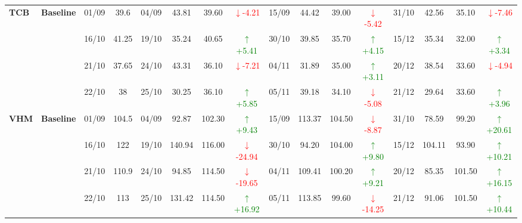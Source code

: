 \documentclass{ieeeaccess}
\begin{document}
{\begin{longtable}{llcc|cccc|cccc|cccc}
\multirow{4}{*}{\textbf{TCB}}
& \textbf{Baseline}
& 01/09 & 39.6 & 04/09 & 43.81 & 39.60 & \textcolor{red}{\(\downarrow\)-4.21} & 15/09 & 44.42 & 39.00 & \textcolor{red}{\(\downarrow\)-5.42} & 31/10 & 42.56 & 35.10 & \textcolor{red}{\(\downarrow\)-7.46} \\
& & 16/10 & 41.25 & 19/10 & 35.24 & 40.65 & \textcolor{green}{\(\uparrow\)+5.41} & 30/10 & 39.85 & 35.70 & \textcolor{green}{\(\uparrow\)+4.15} & 15/12 & 35.34 & 32.00 & \textcolor{green}{\(\uparrow\)+3.34} \\
& & 21/10 & 37.65 & 24/10 & 43.31 & 36.10 & \textcolor{red}{\(\downarrow\)-7.21} & 04/11 & 31.89 & 35.00 & \textcolor{green}{\(\uparrow\)+3.11} & 20/12 & 38.54 & 33.60 & \textcolor{red}{\(\downarrow\)-4.94} \\
& & 22/10 & 38 & 25/10 & 30.25 & 36.10 & \textcolor{green}{\(\uparrow\)+5.85} & 05/11 & 39.18 & 34.10 & \textcolor{red}{\(\downarrow\)-5.08} & 21/12 & 29.64 & 33.60 & \textcolor{green}{\(\uparrow\)+3.96} \\
\midrule

\multirow{4}{*}{\textbf{VHM}}
& \textbf{Baseline}
& 01/09 & 104.5 & 04/09 & 92.87 & 102.30 & \textcolor{green}{\(\uparrow\)+9.43} & 15/09 & 113.37 & 104.50 & \textcolor{red}{\(\downarrow\)-8.87} & 31/10 & 78.59 & 99.20 & \textcolor{green}{\(\uparrow\)+20.61} \\
& & 16/10 & 122 & 19/10 & 140.94 & 116.00 & \textcolor{red}{\(\downarrow\)-24.94} & 30/10 & 94.20 & 104.00 & \textcolor{green}{\(\uparrow\)+9.80} & 15/12 & 104.11 & 93.90 & \textcolor{green}{\(\uparrow\)+10.21} \\
& & 21/10 & 110.9 & 24/10 & 94.85 & 114.50 & \textcolor{red}{\(\downarrow\)-19.65} & 04/11 & 109.41 & 100.20 & \textcolor{green}{\(\uparrow\)+9.21} & 20/12 & 85.35 & 101.50 & \textcolor{green}{\(\uparrow\)+16.15} \\
& & 22/10 & 113 & 25/10 & 131.42 & 114.50 & \textcolor{green}{\(\uparrow\)+16.92} & 05/11 & 113.85 & 99.60 & \textcolor{red}{\(\downarrow\)-14.25} & 21/12 & 91.06 & 101.50 & \textcolor{green}{\(\uparrow\)+10.44} \\
\midrule


\end{longtable}}
\end{document}

